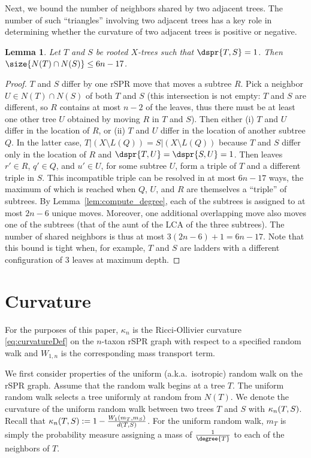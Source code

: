 \documentclass[11pt,onecolumn,conference]{IEEEtran}
\newtheorem{lemma}[theorem]{Lemma}
\newcommand{\curvature}[2][]{%
    \ifthenelse{\equal{#1}{}}%
		{\kappa_n(#2)}%
		{\kappa_n(#1;#2)}%
}
\begin{document}
Next, we bound the number of neighbors shared by two adjacent trees.
The number of such ``triangles'' involving two adjacent trees has a key role in determining whether the curvature of two adjacent trees is positive or negative.

\begin{lemma}
	\label{lem:shared_neighbors}
Let $T$ and $S$ be rooted $X$-trees such that $\dspr{T,S} = 1$.
Then $\size{N(T) \cap N(S)} \le 6n - 17$.
\end{lemma}

\begin{proof}
	$T$ and $S$ differ by one rSPR move that moves a subtree $R$.
	Pick a neighbor $U \in N(T) \cap N(S)$ of both $T$ and $S$ (this intersection is not empty: $T$ and $S$ are different, so $R$ contains at most $n-2$ of the leaves, thus there must be at least one other tree $U$ obtained by moving $R$ in $T$ and $S$).
	Then either (i) $T$ and $U$ differ in the location of $R$, or (ii) $T$ and $U$ differ in the location of another subtree $Q$.
	In the latter case, $T|(X \setminus L(Q)) = S|(X \setminus L(Q))$ because $T$ and $S$ differ only in the location of $R$ and $\dspr{T,U} = \dspr{S,U} = 1$.
	Then leaves $r' \in R$, $q' \in Q$, and $u' \in U$, for some subtree $U$, form a triple of $T$ and a different triple in $S$.
	This incompatible triple can be resolved in at most $6n - 17$ ways, the maximum of which is reached when $Q$, $U$, and $R$ are themselves a ``triple'' of subtrees.
	By Lemma~\ref{lem:compute_degree}, each of the subtrees is assigned to at most $2n-6$ unique moves.
	Moreover, one additional overlapping move also moves one of the subtrees (that of the aunt of the LCA of the three subtrees).
	The number of shared neighbors is thus at most $3(2n-6) + 1 = 6n-17$.
	Note that this bound is tight when, for example, $T$ and $S$ are ladders with a different configuration of 3 leaves at maximum depth.
\end{proof}



\section{Curvature}
For the purposes of this paper, $\kappa_n$ is the Ricci-Ollivier curvature \eqref{eq:curvatureDef} on the $n$-taxon rSPR graph with respect to a specified random walk and $W_{1,n}$ is the corresponding mass transport term.

We first consider properties of the uniform (a.k.a.\ isotropic) random walk on the rSPR graph.
Assume that the random walk begins at a tree $T$.
The uniform random walk selects a tree uniformly at random from $N(T)$.
We denote the curvature of the uniform random walk between two trees $T$ and $S$ with $\curvature{T,S}$.
Recall that $\curvature{T, S} := 1 - \frac{W_1(m_T, m_S)}{d(T, S)}$.
For the uniform random walk, $m_T$ is simply the probability measure assigning a mass of $\frac{1}{\degree{T}}$ to each of the neighbors of $T$.
\end{document}
